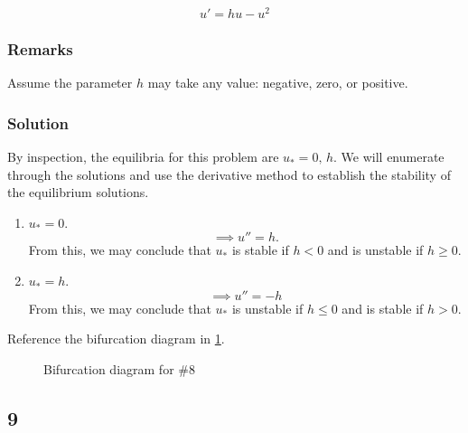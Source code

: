 \documentclass[12pt]{article}
\begin{document}
\begin{equation}
  \label{eq:8a-problem}
  u'=hu-u^2
\end{equation}

\subsubsection*{Remarks}
Assume the parameter $h$ may take any value: negative, zero, or positive.

\subsubsection*{Solution}
By inspection, the equilibria for this problem are $u_*=0,\,h$. We will
enumerate through the solutions and use the derivative method to establish the
stability of the equilibrium solutions.
\begin{enumerate}
\item $u_*=0$.
  $$\implies u''=h.$$ From this, we may conclude that $u_*$ is stable if $h<0$
  and is unstable if $h\ge0$.
\item $u_*=h$.
  $$\implies u''=-h$$ From this, we may conclude that $u_*$ is unstable if $h\le0$
  and is stable if $h>0$.
\end{enumerate}
Reference the bifurcation diagram in \cref{fig:8-bifurcation-diagram}.

\begin{figure}
  \centering
  \caption{Bifurcation diagram for \#8}
  \label{fig:8-bifurcation-diagram}
\end{figure}

\subsection{9}
\end{document}
